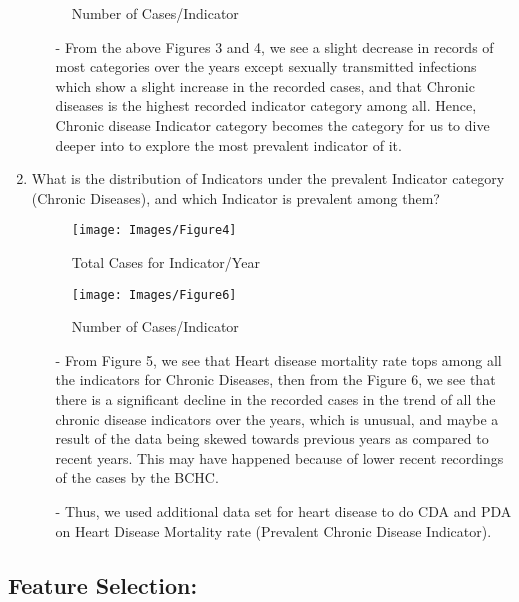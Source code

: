 \documentclass[11pt]{article}
\begin{document}
\begin{multicols}{2}
\begin{enumerate}
\begin{figure}[H]
            \caption{Number of Cases/Indicator}
        \end{figure}
        \begin{itemize}
            \item[-] From the above Figures 3 and 4, we see a slight decrease in records of most categories over the years except sexually transmitted infections which show a slight increase in the recorded cases, and that Chronic diseases is the highest recorded indicator category among all. Hence, Chronic disease Indicator category becomes the category for us to dive deeper into to explore the most prevalent indicator of it.
        \end{itemize}
        \item What is the distribution of Indicators under the prevalent Indicator category (Chronic Diseases), and which Indicator is prevalent among them? 
        \begin{figure}[H]
            \centering
            \texttt{[image: Images/Figure4]}
            \vspace{-15pt}
            \caption{Total Cases for Indicator/Year}
        \end{figure}
        \vspace{-15pt}
        \begin{figure}[H]
            \centering
            \texttt{[image: Images/Figure6]}
            \vspace{-15pt}
            \caption{Number of Cases/Indicator}
        \end{figure}
        \begin{itemize}
            \item[-] From Figure 5, we see that Heart disease mortality rate tops among all the indicators for Chronic Diseases, then from the Figure 6, we see that there is a significant decline in the recorded cases in the trend of all the chronic disease indicators over the years, which is unusual, and maybe a result of the data being skewed towards previous years as compared to recent years. This may have happened because of lower recent recordings of the cases by the BCHC. 
            \item[-] Thus, we used additional data set for heart disease to do CDA and PDA on Heart Disease Mortality rate (Prevalent Chronic Disease Indicator). 
        \end{itemize}
    \end{enumerate}
    \subsection{Feature Selection:}

\end{multicols}
\end{document}
